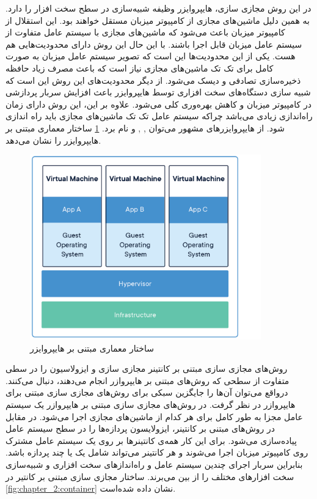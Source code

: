       در این روش مجازی سازی، {هایپروایزر} وظیفه شبیه‌سازی در سطح سخت افزار را دارد.
      به همین دلیل ماشین‌های مجازی از کامپیوتر میزبان مستقل خواهند بود.
      این استقلال از کامپیوتر میزبان باعث می‌شود که ماشین‌های مجازی با سیستم عامل متفاوت از سیستم عامل میزبان قابل اجرا باشند\cite{morabito2015hypervisors}.
      با این حال این روش دارای محدودیت‌هایی هم هست.
      یکی از این محدودیت‌ها این است که تصویر سیستم عامل میزبان به صورت کامل برای تک تک ماشین‌های مجازی نیاز است که باعث مصرف زیاد حافظه ذخیره‌سازی تصادفی و دیسک می‌شود.
      از دیگر محدودیت‌های این روش این است که شبیه سازی دستگاه‌های سخت افزاری توسط {هایپروایزر}  باعث افزایش سربار پردازشی در کامپیوتر میزبان و کاهش بهره‌وری کلی می‌شود.
      علاوه بر این، این روش دارای زمان راه‌اندازی زیادی می‌باشد چراکه سیستم عامل تک تک ماشین‌های مجازی باید راه اندازی شود.
    از {هایپروایزر}های مشهور می‌توان \cite{2019kvm}, \cite{2019esxi}, \cite{2019xen} و \cite{2019hyper} نام برد.
      \cref{fig:chapter_2:vm} ساختار معماری مبتنی بر {هایپروایزر} را نشان می‌دهد.

      \begin{figure}[]
        \centerline{\includegraphics[width=10cm]{graphics/chapter_2/vm}}
        \caption{ساختار معماری مبتنی بر {هایپروایزر} \cite{2018are}}
        \label{fig:chapter_2:vm}
      \end{figure}

      روش‌های مجازی سازی مبتنی بر کانتینر مجازی سازی و ایزولاسیون را در سطی متفاوت از سطحی که روش‌های مبتنی بر {هایپروازر} انجام می‌دهند، دنبال می‌کنند.
      درواقع می‌توان آن‌ها را جایگزین سبکی برای روش‌های مجازی سازی مبتنی برای {هایپروازر} در نظر گرفت.
      در روش‌های مجازی سازی مبتنی بر {هایپروازر} یک سیستم عامل مجزا به طور کامل برای هر کدام از ماشین‌های مجازی اجرا می‌شود.
      در مقابل در روش‌های مبتنی بر کانتینر، ایزولایسون پردازه‌ها را در سطح سیستم عامل پیاده‌سازی می‌شود.
      برای این کار همه‌ی کانتینر‌ها بر روی یک سیستم عامل مشترک روی کامپیوتر میزبان اجرا می‌شوند و هر کانتینر می‌تواند شامل یک یا چند پردازه باشد.
      بنابراین سربار اجرای چندین سیستم عامل و راه‌انداز‌های سخت افزاری و شبیه‌سازی سخت افزار‌های مختلف را از بین می‌برند.
      ساختار مجازی سازی مبتنی بر کانتیر در \cref{fig:chapter_2:container} نشان داده شده‌است.
            
